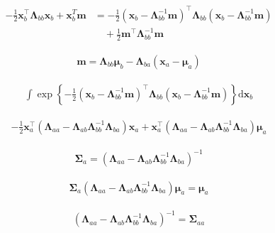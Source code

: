 \documentclass{article}
\begin{document}
\begin{align*}
-\frac{1}{2} \mathbf{x}_{b}^{\top} \boldsymbol{\Lambda}_{b b} \mathbf{x}_{b} + \mathbf{x}_{b}^{T} \mathbf{m} 
& = -\frac{1}{2} \left(\mathbf{x}_{b} - \boldsymbol{\Lambda}_{b b}^{-1} \mathbf{m}\right)^{\top} \boldsymbol{\Lambda}_{b b}\left(\mathbf{x}_{b} - \boldsymbol{\Lambda}_{b b}^{-1} \mathbf{m}\right) \\
& \quad + \frac{1}{2} \mathbf{m}^{\top} \boldsymbol{\Lambda}_{b b}^{-1} \mathbf{m}
\tag{3.68}
\end{align*}

\begin{align*}
\mathbf{m} = \boldsymbol{\Lambda}_{b b} \boldsymbol{\mu}_{b} - \boldsymbol{\Lambda}_{b a}\left(\mathbf{x}_{a} - \boldsymbol{\mu}_{a}\right)
\tag{3.69}
\end{align*}

\begin{align*}
\int \exp \left\{-\frac{1}{2}\left(\mathbf{x}_{b} - \boldsymbol{\Lambda}_{b b}^{-1} \mathbf{m}\right)^{\top} \boldsymbol{\Lambda}_{b b}\left(\mathbf{x}_{b} - \boldsymbol{\Lambda}_{b b}^{-1} \mathbf{m}\right)\right\} \mathrm{d} \mathbf{x}_{b}
\tag{3.70}
\end{align*}

\begin{align*}
-\frac{1}{2} \mathbf{x}_{a}^{\top}\left(\boldsymbol{\Lambda}_{a a} - \boldsymbol{\Lambda}_{a b} \boldsymbol{\Lambda}_{b b}^{-1} \boldsymbol{\Lambda}_{b a}\right) \mathbf{x}_{a} 
+ \mathbf{x}_{a}^{\top}\left(\boldsymbol{\Lambda}_{a a} - \boldsymbol{\Lambda}_{a b} \boldsymbol{\Lambda}_{b b}^{-1} \boldsymbol{\Lambda}_{b a}\right) \boldsymbol{\mu}_{a}
\tag{3.71}
\end{align*}

\begin{align*}
\boldsymbol{\Sigma}_{a} = \left(\boldsymbol{\Lambda}_{a a} - \boldsymbol{\Lambda}_{a b} \boldsymbol{\Lambda}_{b b}^{-1} \boldsymbol{\Lambda}_{b a}\right)^{-1}
\tag{3.72}
\end{align*}

\begin{align*}
\boldsymbol{\Sigma}_{a}\left(\boldsymbol{\Lambda}_{a a} - \boldsymbol{\Lambda}_{a b} \boldsymbol{\Lambda}_{b b}^{-1} \boldsymbol{\Lambda}_{b a}\right) \boldsymbol{\mu}_{a} = \boldsymbol{\mu}_{a}
\tag{3.73}
\end{align*}

\begin{align*}
\left(\boldsymbol{\Lambda}_{a a} - \boldsymbol{\Lambda}_{a b} \boldsymbol{\Lambda}_{b b}^{-1} \boldsymbol{\Lambda}_{b a}\right)^{-1} = \boldsymbol{\Sigma}_{a a}
\tag{3.75}
\end{align*}
\end{document}
